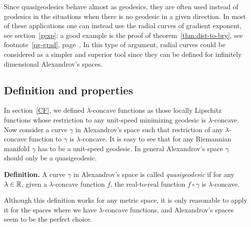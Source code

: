 \documentclass{article}
\begin{document}
Since quasigeodesics behave almost as geodesics, they are often used instead of geodesics in
the situations when there is no geodesic in a given direction.
In most of these applications one can instead use the radial curves of gradient
exponent, see section~\ref{gexp}; 
a good example is the proof of
theorem~\ref{thm:dist-to-bry}, see footnote~\ref{qg-grad},
page~\pageref{qg-grad}.
In this type of argument, radial curves could be considered as a simpler and
superior tool since they can be defined for infinitely dimensional Alexandrov's spaces. 









\subsection{Definition and properties}

In section~\ref{CF}, we defined $\lambda$-concave functions  as those locally
Lipschitz functions whose restriction to any unit-speed minimizing geodesic is
$\lambda$-concave. 
Now consider a curve $\gamma$ in Alexandrov's space such that restriction of any
$\lambda$-concave function to $\gamma$ is $\lambda$-concave.
It is easy to see that for any Riemannian manifold $\gamma$ has to be a unit-speed
geodesic. 
In general Alexandrov's space $\gamma$ should only be a
quasigeodesic.

\begin{thm}{\bf Definition.} A curve $\gamma$ in Alexandrov's space is called
\emph{quasigeodesic} if for any $\lambda\in\mathbb{R}$, given a $\lambda$-concave
function $f$, the real-to-real function $f\circ\gamma$ is $\lambda$-concave.
\end{thm}

Although this definition works for any metric space, it is only reasonable to
apply it for the spaces where we have $\lambda$-concave functions, and
Alexandrov's spaces seem to be the perfect choice.
\end{document}
